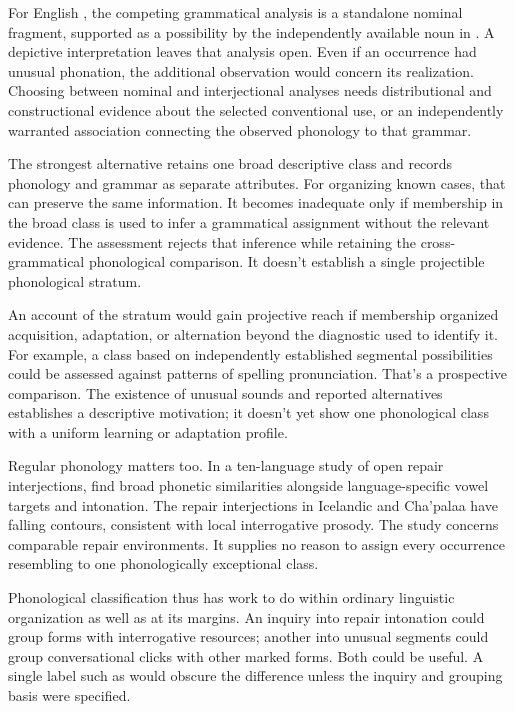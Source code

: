 \documentclass[12pt]{article}
\begin{document}
For English , the competing grammatical analysis is a
standalone nominal fragment, supported as a possibility by the independently
available noun in . A depictive interpretation leaves
that analysis open. Even if an occurrence had unusual phonation, the
additional observation would concern its realization. Choosing between
nominal and interjectional analyses needs distributional and constructional
evidence about the selected conventional use, or an independently warranted
association connecting the observed phonology to that grammar.

The strongest alternative retains one broad descriptive class and records
phonology and grammar as separate attributes. For organizing known cases,
that can preserve the same information. It becomes inadequate only if
membership in the broad class is used to infer a grammatical assignment
without the relevant evidence. The assessment rejects
that inference while retaining the cross-grammatical phonological
comparison. It doesn't establish a single projectible phonological stratum.

An account of the stratum would gain projective reach if membership
organized acquisition, adaptation, or alternation beyond the diagnostic
used to identify it. For example, a class based on independently
established segmental possibilities could be assessed against patterns of
spelling pronunciation. That's a prospective comparison. The existence
of unusual sounds and reported alternatives establishes a descriptive
motivation; it doesn't yet show one phonological class with a uniform
learning or adaptation profile.

Regular phonology matters too. In a ten-language study of open repair
interjections, \textcite{dingemanse2013huh} find broad phonetic similarities
alongside language-specific vowel targets and intonation. The repair interjections in Icelandic and
Cha'palaa have falling contours, consistent with local interrogative
prosody. The study concerns comparable repair environments. It supplies
no reason to assign every occurrence resembling  to one
phonologically exceptional class.

Phonological classification thus has work to do within ordinary linguistic
organization as well as at its margins. An inquiry into repair intonation
could group forms with interrogative resources; another into unusual
segments could group conversational clicks with other marked forms.
Both could be useful. A single label such as  would obscure
the difference unless the inquiry and grouping basis were specified.
\end{document}
